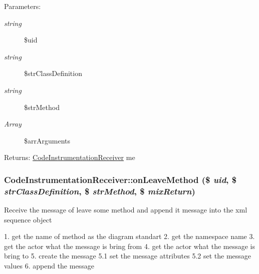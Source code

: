 \begin{Desc}
\item[Parameters:]
\begin{description}
\item[{\em string}]\$uid \item[{\em string}]\$strClassDefinition \item[{\em string}]\$strMethod \item[{\em Array}]\$arrArguments \end{description}
\end{Desc}
\begin{Desc}
\item[Returns:]\hyperlink{class_code_instrumentation_receiver}{CodeInstrumentationReceiver} me \end{Desc}
\hypertarget{class_code_instrumentation_receiver_dbe8202a28014f81a7c18f59f557fadc}{
\subsubsection[{onLeaveMethod}]{\setlength{\rightskip}{0pt plus 5cm}CodeInstrumentationReceiver::onLeaveMethod (\$ {\em uid}, \/  \$ {\em strClassDefinition}, \/  \$ {\em strMethod}, \/  \$ {\em mixReturn})}}
\label{class_code_instrumentation_receiver_dbe8202a28014f81a7c18f59f557fadc}


Receive the message of leave some method and append it message into the xml sequence object

1. get the name of method as the diagram standart 2. get the namespace name 3. get the actor what the message is bring from 4. get the actor what the message is bring to 5. create the message 5.1 set the message attributes 5.2 set the message values 6. append the message

